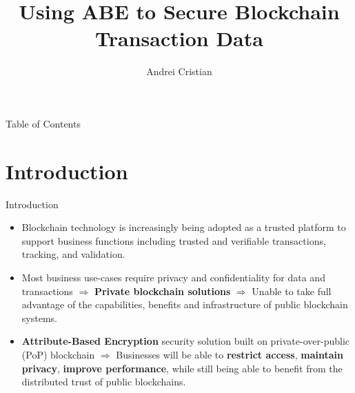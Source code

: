 \documentclass[11pt]{beamer}
\author{Andrei Cristian}
\title{Using ABE to Secure Blockchain Transaction Data}
\begin{document}
\begin{frame}
\titlepage
\end{frame}

\begin{frame}{Table of Contents}
\tableofcontents
\end{frame}

\section{Introduction}
\begin{frame}{Introduction}
\begin{itemize}
	\item Blockchain technology is increasingly being adopted as a trusted platform to support business functions including trusted and verifiable transactions, tracking, and validation.
	\item Most business use-cases require privacy and confidentiality for data and transactions $\Rightarrow$ \textbf{Private blockchain solutions} $\Rightarrow$ Unable to take full advantage of the capabilities, benefits and infrastructure of public blockchain systems.
	\item \textbf{Attribute-Based Encryption} security solution built on private-over-public (PoP) blockchain $\Rightarrow$ Businesses will be able to \textbf{restrict access}, \textbf{maintain privacy}, \textbf{improve performance}, while still being able to benefit from the distributed trust of public blockchains.
\end{itemize}
\end{frame}
\end{document}
